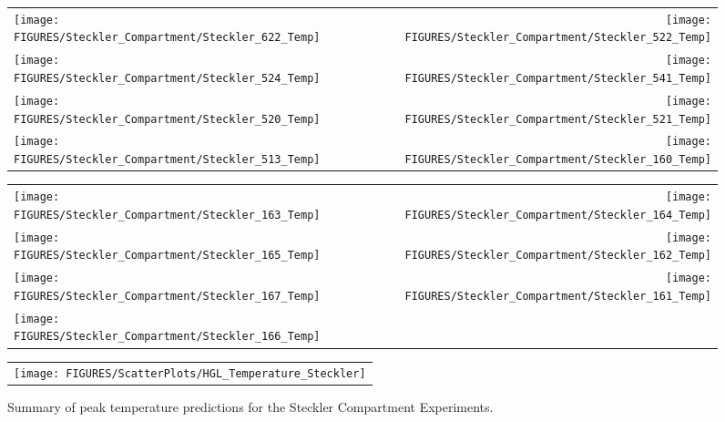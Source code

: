 \begin{figure}[p]
\begin{tabular*}{\textwidth}{l@{\extracolsep{\fill}}r}
\texttt{[image: FIGURES/Steckler\_Compartment/Steckler\_622\_Temp]} &
\texttt{[image: FIGURES/Steckler\_Compartment/Steckler\_522\_Temp]} \\
\texttt{[image: FIGURES/Steckler\_Compartment/Steckler\_524\_Temp]} &
\texttt{[image: FIGURES/Steckler\_Compartment/Steckler\_541\_Temp]} \\
\texttt{[image: FIGURES/Steckler\_Compartment/Steckler\_520\_Temp]} &
\texttt{[image: FIGURES/Steckler\_Compartment/Steckler\_521\_Temp]} \\
\texttt{[image: FIGURES/Steckler\_Compartment/Steckler\_513\_Temp]} &
\texttt{[image: FIGURES/Steckler\_Compartment/Steckler\_160\_Temp]}
\end{tabular*}
\label{Steckler_Temp_6}
\end{figure}

\begin{figure}[p]
\begin{tabular*}{\textwidth}{l@{\extracolsep{\fill}}r}
\texttt{[image: FIGURES/Steckler\_Compartment/Steckler\_163\_Temp]} &
\texttt{[image: FIGURES/Steckler\_Compartment/Steckler\_164\_Temp]} \\
\texttt{[image: FIGURES/Steckler\_Compartment/Steckler\_165\_Temp]} &
\texttt{[image: FIGURES/Steckler\_Compartment/Steckler\_162\_Temp]} \\
\texttt{[image: FIGURES/Steckler\_Compartment/Steckler\_167\_Temp]} &
\texttt{[image: FIGURES/Steckler\_Compartment/Steckler\_161\_Temp]} \\
\texttt{[image: FIGURES/Steckler\_Compartment/Steckler\_166\_Temp]} &

\end{tabular*}
\label{Steckler_Temp_7}
\end{figure}

\begin{figure}[p]
\begin{center}
\begin{tabular}{l}
\texttt{[image: FIGURES/ScatterPlots/HGL\_Temperature\_Steckler]}
\end{tabular}
\caption{Summary of peak temperature predictions for the Steckler Compartment Experiments.}
\end{center}
\end{figure}


